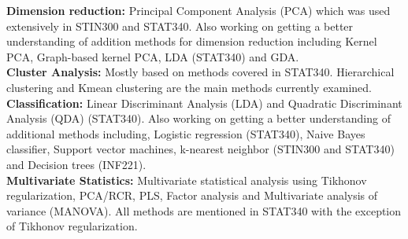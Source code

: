 \documentclass[../thesis/thesis.tex]{subfiles}
\begin{document}
\noindent \textbf{Dimension reduction:} Principal Component Analysis (PCA) which was used extensively in STIN300 and STAT340. Also working on getting a better understanding of addition methods for dimension reduction including Kernel PCA, Graph-based kernel PCA, LDA (STAT340) and GDA.\\

\noindent \textbf{Cluster Analysis:} Mostly based on methods covered in STAT340. Hierarchical clustering and Kmean clustering are the main methods currently examined.\\

\noindent \textbf{Classification:} Linear Discriminant Analysis (LDA) and Quadratic Discriminant Analysis (QDA) (STAT340). Also working on getting a better understanding of additional methods including, Logistic regression (STAT340), Naive Bayes classifier, Support vector machines, k-nearest neighbor (STIN300 and STAT340) and Decision trees (INF221). \\

\noindent \textbf{Multivariate Statistics:}  Multivariate statistical analysis using Tikhonov regularization, PCA/RCR, PLS, Factor analysis and Multivariate analysis of variance (MANOVA). All methods are mentioned in STAT340 with the exception of Tikhonov regularization.

 

\end{document}
